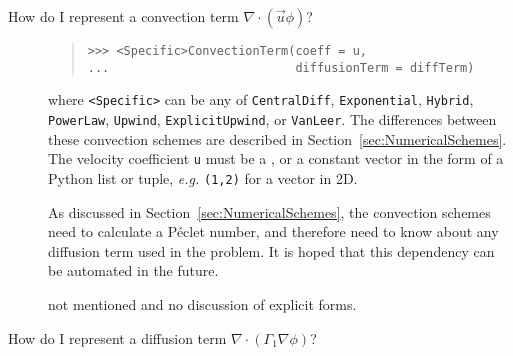 \begin{description}
\begin{description}
            \item[How do I represent a convection term
            $\nabla \cdot \left( \vec{u} \phi \right)$?]
            \hspace*{\fill}
            
            \begin{quote}
\begin{verbatim}
>>> <Specific>ConvectionTerm(coeff = u, 
...                          diffusionTerm = diffTerm)
\end{verbatim}
            \end{quote}
            where \verb|<Specific>| can be any of \verb|CentralDiff|,
            \verb|Exponential|, \verb|Hybrid|, \verb|PowerLaw|,
            \verb|Upwind|, \verb|ExplicitUpwind|, or \verb|VanLeer|.
            The differences between these convection schemes are described
            in Section~\ref{sec:NumericalSchemes}. The velocity coefficient 
            \verb|u| must be a , or a 
            constant vector in the form of a Python list or tuple, 
            \emph{e.g.} \verb|(1,2)| for a vector in 2D.
            
            \begin{reSTadmonition}[Note]
                As discussed in Section~\ref{sec:NumericalSchemes}, the
                convection schemes need to calculate a P\'eclet number,
                and therefore need to know about any diffusion term
                used in the problem.  It is hoped that this dependency
                can be automated in the future.
            \end{reSTadmonition}
            
            \begin{reSTadmonition}[Warning]
                 not mentioned and no discussion of
                explicit forms.
            \end{reSTadmonition}
        
            \item[How do I represent a diffusion term
            $\nabla \cdot \left( \Gamma_1 \nabla \phi \right)$?]
            \hspace*{\fill}
            

\end{description}
\end{description}
